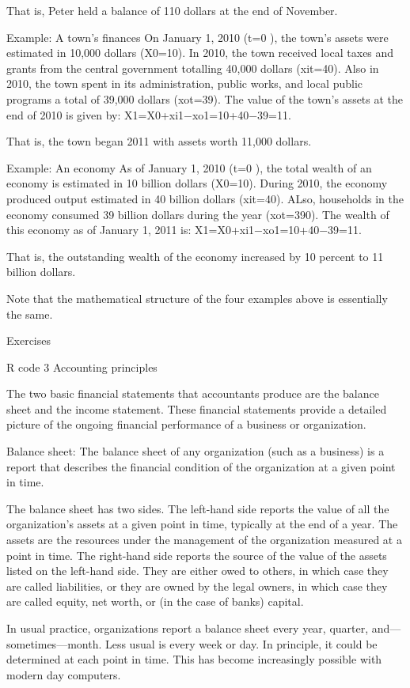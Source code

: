 \documentclass[
]{article}
\begin{document}
That is, Peter held a balance of 110 dollars at the end of November.

Example: A town's finances On January 1, 2010 (t=0 ), the town's assets
were estimated in 10,000 dollars (X0=10). In 2010, the town received
local taxes and grants from the central government totalling 40,000
dollars (xit=40). Also in 2010, the town spent in its administration,
public works, and local public programs a total of 39,000 dollars
(xot=39). The value of the town's assets at the end of 2010 is given by:
X1=X0+xi1−xo1=10+40−39=11.

That is, the town began 2011 with assets worth 11,000 dollars.

Example: An economy As of January 1, 2010 (t=0 ), the total wealth of an
economy is estimated in 10 billion dollars (X0=10). During 2010, the
economy produced output estimated in 40 billion dollars (xit=40). ALso,
households in the economy consumed 39 billion dollars during the year
(xot=390). The wealth of this economy as of January 1, 2011 is:
X1=X0+xi1−xo1=10+40−39=11.

That is, the outstanding wealth of the economy increased by 10 percent
to 11 billion dollars.

Note that the mathematical structure of the four examples above is
essentially the same.

Exercises

R code 3 Accounting principles

The two basic financial statements that accountants produce are the
balance sheet and the income statement. These financial statements
provide a detailed picture of the ongoing financial performance of a
business or organization.

Balance sheet: The balance sheet of any organization (such as a
business) is a report that describes the financial condition of the
organization at a given point in time.

The balance sheet has two sides. The left-hand side reports the value of
all the organization's assets at a given point in time, typically at the
end of a year. The assets are the resources under the management of the
organization measured at a point in time. The right-hand side reports
the source of the value of the assets listed on the left-hand side. They
are either owed to others, in which case they are called liabilities, or
they are owned by the legal owners, in which case they are called
equity, net worth, or (in the case of banks) capital.

In usual practice, organizations report a balance sheet every year,
quarter, and---sometimes---month. Less usual is every week or day. In
principle, it could be determined at each point in time. This has become
increasingly possible with modern day computers.
\end{document}
